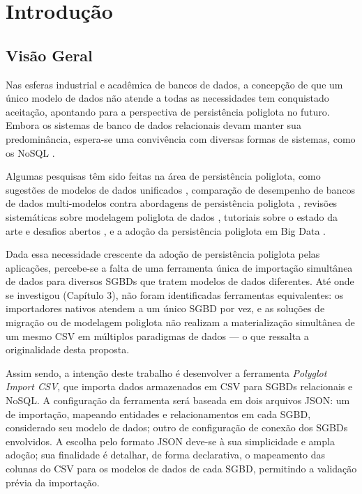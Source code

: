 \chapter{Introdução}
\label{cap:introducao}

\section{Visão Geral}

Nas esferas industrial e acadêmica de bancos de dados, a concepção de que um único modelo
de dados não atende a todas as necessidades tem conquistado aceitação, apontando para a
perspectiva de persistência poliglota no futuro. Embora os sistemas de banco de dados
relacionais devam manter sua predominância, espera-se uma convivência com diversas formas
de sistemas, como os NoSQL \cite{sadalage2013nosql}.

Algumas pesquisas têm sido feitas na área de persistência poliglota, como sugestões de
modelos de dados unificados \cite{chillon2023propagating}, comparação de desempenho de
bancos de dados multi-modelos contra abordagens de persistência poliglota
\cite{ye2023benchmark}, revisões sistemáticas sobre modelagem poliglota de dados
\cite{silva2024modelagem}, tutoriais sobre o estado da arte e desafios abertos
\cite{kiehn2022polyglot}, e a adoção da persistência poliglota em Big Data
\cite{khine2019review}.

Dada essa necessidade crescente da adoção de persistência poliglota pelas aplicações,
percebe-se a falta de uma ferramenta única de importação simultânea de dados para diversos
SGBDs que tratem modelos de dados diferentes. Até onde se investigou (Capítulo 3), não
foram identificadas ferramentas equivalentes: os importadores nativos atendem a um único
SGBD por vez, e as soluções de migração ou de modelagem poliglota não realizam a
materialização simultânea de um mesmo CSV em múltiplos paradigmas de dados --- o que
ressalta a originalidade desta proposta.

Assim sendo, a intenção deste trabalho é desenvolver a ferramenta \textit{Polyglot Import
CSV}, que importa dados armazenados em CSV para SGBDs relacionais e NoSQL. A configuração
da ferramenta será baseada em dois arquivos JSON: um de importação, mapeando entidades e
relacionamentos em cada SGBD, considerado seu modelo de dados; outro de configuração de
conexão dos SGBDs envolvidos. A escolha pelo formato JSON deve-se à sua simplicidade e
ampla adoção; sua finalidade é detalhar, de forma declarativa, o mapeamento das colunas do
CSV para os modelos de dados de cada SGBD, permitindo a validação prévia da importação.

